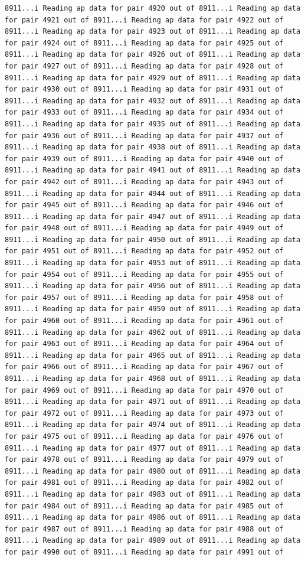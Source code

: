 \documentclass[
]{article}
\begin{document}
\begin{verbatim}
8911...i Reading ap data for pair 4920 out of 8911...i Reading ap data for pair 4921 out of 8911...i Reading ap data for pair 4922 out of 8911...i Reading ap data for pair 4923 out of 8911...i Reading ap data for pair 4924 out of 8911...i Reading ap data for pair 4925 out of 8911...i Reading ap data for pair 4926 out of 8911...i Reading ap data for pair 4927 out of 8911...i Reading ap data for pair 4928 out of 8911...i Reading ap data for pair 4929 out of 8911...i Reading ap data for pair 4930 out of 8911...i Reading ap data for pair 4931 out of 8911...i Reading ap data for pair 4932 out of 8911...i Reading ap data for pair 4933 out of 8911...i Reading ap data for pair 4934 out of 8911...i Reading ap data for pair 4935 out of 8911...i Reading ap data for pair 4936 out of 8911...i Reading ap data for pair 4937 out of 8911...i Reading ap data for pair 4938 out of 8911...i Reading ap data for pair 4939 out of 8911...i Reading ap data for pair 4940 out of 8911...i Reading ap data for pair 4941 out of 8911...i Reading ap data for pair 4942 out of 8911...i Reading ap data for pair 4943 out of 8911...i Reading ap data for pair 4944 out of 8911...i Reading ap data for pair 4945 out of 8911...i Reading ap data for pair 4946 out of 8911...i Reading ap data for pair 4947 out of 8911...i Reading ap data for pair 4948 out of 8911...i Reading ap data for pair 4949 out of 8911...i Reading ap data for pair 4950 out of 8911...i Reading ap data for pair 4951 out of 8911...i Reading ap data for pair 4952 out of 8911...i Reading ap data for pair 4953 out of 8911...i Reading ap data for pair 4954 out of 8911...i Reading ap data for pair 4955 out of 8911...i Reading ap data for pair 4956 out of 8911...i Reading ap data for pair 4957 out of 8911...i Reading ap data for pair 4958 out of 8911...i Reading ap data for pair 4959 out of 8911...i Reading ap data for pair 4960 out of 8911...i Reading ap data for pair 4961 out of 8911...i Reading ap data for pair 4962 out of 8911...i Reading ap data for pair 4963 out of 8911...i Reading ap data for pair 4964 out of 8911...i Reading ap data for pair 4965 out of 8911...i Reading ap data for pair 4966 out of 8911...i Reading ap data for pair 4967 out of 8911...i Reading ap data for pair 4968 out of 8911...i Reading ap data for pair 4969 out of 8911...i Reading ap data for pair 4970 out of 8911...i Reading ap data for pair 4971 out of 8911...i Reading ap data for pair 4972 out of 8911...i Reading ap data for pair 4973 out of 8911...i Reading ap data for pair 4974 out of 8911...i Reading ap data for pair 4975 out of 8911...i Reading ap data for pair 4976 out of 8911...i Reading ap data for pair 4977 out of 8911...i Reading ap data for pair 4978 out of 8911...i Reading ap data for pair 4979 out of 8911...i Reading ap data for pair 4980 out of 8911...i Reading ap data for pair 4981 out of 8911...i Reading ap data for pair 4982 out of 8911...i Reading ap data for pair 4983 out of 8911...i Reading ap data for pair 4984 out of 8911...i Reading ap data for pair 4985 out of 8911...i Reading ap data for pair 4986 out of 8911...i Reading ap data for pair 4987 out of 8911...i Reading ap data for pair 4988 out of 8911...i Reading ap data for pair 4989 out of 8911...i Reading ap data for pair 4990 out of 8911...i Reading ap data for pair 4991 out of 
\end{verbatim}
\end{document}
